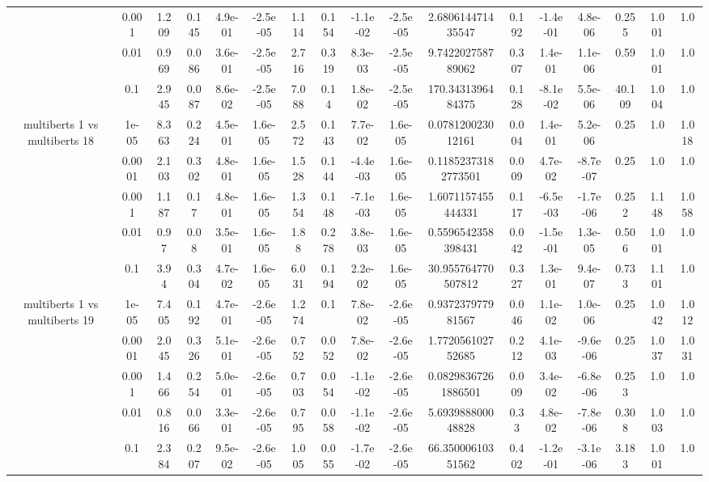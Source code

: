 \begin{tabular}{|c|c|c|c|c|c|c|c|c|c|c|c|c|c|c|c|c|}
 & 0.001 & 1.209 & 0.145 & 4.9e-01 & -2.5e-05 & 1.114 & 0.154 & -1.1e-02 & -2.5e-05 & 2.680614471435547 & 0.192 & -1.4e-01 & 4.8e-06 & 0.255 & 1.001 & 1.0 \\
 & 0.01 & 0.969 & 0.086 & 3.6e-01 & -2.5e-05 & 2.716 & 0.319 & 8.3e-03 & -2.5e-05 & 9.742202758789062 & 0.307 & 1.4e-01 & 1.1e-06 & 0.59 & 1.001 & 1.0 \\
 & 0.1 & 2.945 & 0.087 & 8.6e-02 & -2.5e-05 & 7.088 & 0.14 & 1.8e-02 & -2.5e-05 & 170.3431396484375 & 0.128 & -8.1e-02 & 5.5e-06 & 40.109 & 1.004 & 1.0 \\
\hline
\multirow{5}{*}{multiberts 1 vs multiberts 18} & 1e-05 & 8.363 & 0.224 & 4.5e-01 & 1.6e-05 & 2.572 & 0.143 & 7.7e-02 & 1.6e-05 & 0.078120023012161 & 0.004 & 1.4e-01 & 5.2e-06 & 0.25 & 1.0 & 1.018 \\
 & 0.0001 & 2.103 & 0.302 & 4.8e-01 & 1.6e-05 & 1.528 & 0.144 & -4.4e-03 & 1.6e-05 & 0.11852373182773501 & 0.009 & 4.7e-02 & -8.7e-07 & 0.25 & 1.0 & 1.0 \\
 & 0.001 & 1.187 & 0.17 & 4.8e-01 & 1.6e-05 & 1.354 & 0.148 & -7.1e-03 & 1.6e-05 & 1.6071157455444331 & 0.117 & -6.5e-03 & -1.7e-06 & 0.252 & 1.148 & 1.058 \\
 & 0.01 & 0.97 & 0.08 & 3.5e-01 & 1.6e-05 & 1.88 & 0.278 & 3.8e-03 & 1.6e-05 & 0.5596542358398431 & 0.042 & -1.5e-01 & 1.3e-05 & 0.506 & 1.001 & 1.0 \\
 & 0.1 & 3.94 & 0.304 & 4.7e-02 & 1.6e-05 & 6.031 & 0.194 & 2.2e-02 & 1.6e-05 & 30.955764770507812 & 0.327 & 1.3e-01 & 9.4e-07 & 0.733 & 1.101 & 1.0 \\
\hline
\multirow{5}{*}{multiberts 1 vs multiberts 19} & 1e-05 & 7.405 & 0.192 & 4.7e-01 & -2.6e-05 & 1.274 & 0.1 & 7.8e-02 & -2.6e-05 & 0.937237977981567 & 0.046 & 1.1e-02 & 1.0e-06 & 0.25 & 1.042 & 1.012 \\
 & 0.0001 & 2.045 & 0.326 & 5.1e-01 & -2.6e-05 & 0.752 & 0.052 & 7.8e-02 & -2.6e-05 & 1.772056102752685 & 0.212 & 4.1e-03 & -9.6e-06 & 0.25 & 1.037 & 1.031 \\
 & 0.001 & 1.466 & 0.254 & 5.0e-01 & -2.6e-05 & 0.703 & 0.054 & -1.1e-02 & -2.6e-05 & 0.08298367261886501 & 0.009 & 3.4e-02 & -6.8e-06 & 0.253 & 1.0 & 1.0 \\
 & 0.01 & 0.816 & 0.066 & 3.3e-01 & -2.6e-05 & 0.795 & 0.058 & -1.1e-02 & -2.6e-05 & 5.693988800048828 & 0.33 & 4.8e-02 & -7.8e-06 & 0.308 & 1.003 & 1.0 \\
 & 0.1 & 2.384 & 0.207 & 9.5e-02 & -2.6e-05 & 1.005 & 0.055 & -1.7e-02 & -2.6e-05 & 66.35000610351562 & 0.402 & -1.2e-01 & -3.1e-06 & 3.183 & 1.001 & 1.0 \\

\end{tabular}
